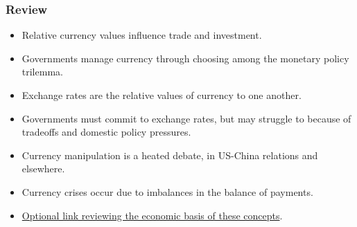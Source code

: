 \documentclass{beamer}
\begin{document}
\begin{frame} 
	\frametitle{\LARGE{Review}}
	\begin{itemize}
		
			\item Relative currency values influence trade and investment. \pause  

			\item Governments manage currency through choosing among the monetary policy trilemma.  \pause

			\item Exchange rates are the relative values of currency to one another. \pause 

			\item Governments must commit to exchange rates, but may struggle to because of tradeoffs and domestic policy pressures. \pause 

			\item Currency manipulation is a heated debate, in US-China relations and elsewhere.
			
			\item Currency crises occur due to imbalances in the balance of payments.
			
			\item \href{https://www.youtube.com/watch?v=geoe-6NBy10}{Optional link reviewing the economic basis of these concepts}.
			

			
	
	\end{itemize}
\end{frame}
\end{document}
